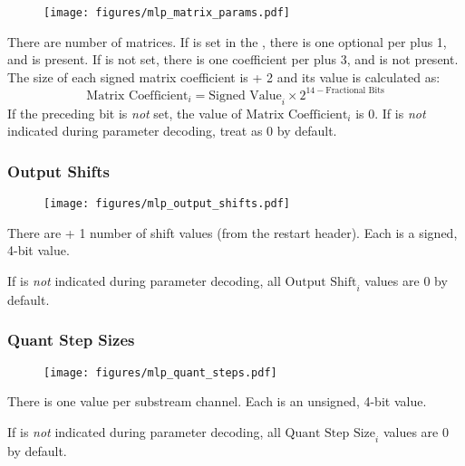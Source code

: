 \begin{figure}[h]
\texttt{[image: figures/mlp\_matrix\_params.pdf]}
\end{figure}
\par
\noindent
There are  number of matrices.
If  is set in the ,
there is one optional  per
 plus 1, and  is present.
If  is not set, there is one coefficient per
 plus 3, and  is not present.
The size of each signed matrix coefficient is  + 2
and its value is calculated as:
\begin{equation*}
\text{Matrix Coefficient}_i = \text{Signed Value}_i \times 2 ^ {14 - \text{Fractional Bits}}
\end{equation*}
If the preceding  bit is \textit{not} set,
the value of $\text{Matrix Coefficient}_i$ is 0.
If  is \textit{not} indicated during parameter decoding,
treat  as 0 by default.

\subsubsection{Output Shifts}


\begin{figure}[h]
\texttt{[image: figures/mlp\_output\_shifts.pdf]}
\end{figure}
\par
\noindent
There are  + 1 number of shift values
(from the restart header).
Each is a signed, 4-bit value.
\par
If  is \textit{not} indicated during parameter
decoding, all $\text{Output Shift}_i$ values are 0 by default.


\subsubsection{Quant Step Sizes}

\begin{figure}[h]
\texttt{[image: figures/mlp\_quant\_steps.pdf]}
\end{figure}
\par
\noindent
There is one  value per substream channel.
Each is an unsigned, 4-bit value.
\par
If  is \textit{not} indicated during parameter
decoding, all $\text{Quant Step Size}_i$ values are 0 by default.


